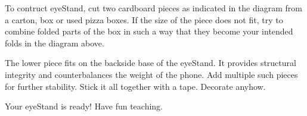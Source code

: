 \documentclass[a4paper]{article}
\begin{document}
To contruct eyeStand, cut two cardboard pieces as indicated in the diagram from a carton, box or used pizza boxes. If the size of the piece does not fit, try to combine folded parts of the box in such a way that they become your intended folds in the diagram above.

The lower piece fits on the backside base of the eyeStand. It provides structural integrity and counterbalances the weight of the phone. Add multiple such pieces for further stability. Stick it all together with a tape. Decorate anyhow. 

Your eyeStand is ready! Have fun teaching.



  
\end{document}

